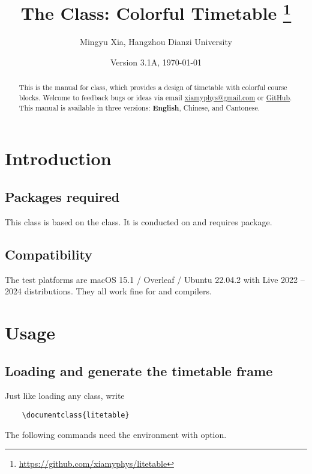 \documentclass[letterpaper]{l3doc}
\title{
    The \cls{litetable} Class: Colorful Timetable
    \thanks{\url{https://github.com/xiamyphys/litetable}}
}
\author{Mingyu Xia, Hangzhou Dianzi University}
\affil{\href{mailto:xiamyphys@gmail.com}{xiamyphys@gmail.com}}
\date{Version 3.1A, \today}
\begin{document}
\maketitle

\begin{abstract}
    This is the manual for  class, which provides a design of timetable with colorful course blocks. Welcome to feedback bugs or ideas via email \href{mailto:xiamyphys@gmail.com}{xiamyphys@gmail.com} or \href{https://github.com/xiamyphys/litetable/issues}{GitHub}. This manual is available in three versions: \textbf{English}, Chinese, and Cantonese.
\end{abstract}

\section{Introduction}

\subsection{Packages required}

This class is based on the  class. It is conducted on  and requires  package.

\subsection{Compatibility}

The test platforms are macOS 15.1 / Overleaf / Ubuntu 22.04.2 with Live 2022 -- 2024 distributions. They all work fine for  and  compilers.

\section{Usage}

\subsection{Loading  and generate the timetable frame}

Just like loading any class, write

\begin{Verbatim}
    \documentclass{litetable}
\end{Verbatim}

The following commands need the  environment with  option.
\end{document}
